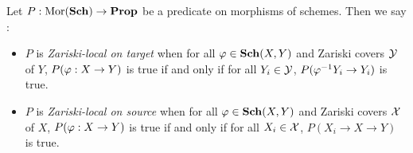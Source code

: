 \documentclass[../main.tex]{subfiles}
\begin{document}
\begin{dfn}
  Let $P : \operatorname{Mor}(\mathbf{Sch}) \to \mathbf{Prop}$ be a predicate on morphisms of schemes.
  Then we say :
  \begin{itemize}
    \item $P$ is \emph{Zariski-local on target} when 
    for all $\varphi \in \mathbf{Sch}(X,Y)$ and Zariski covers $\mathcal{Y}$ of $Y$,\newline
    $P(\varphi : X \to Y)$ is true if and only if 
    for all $Y_i \in \mathcal{Y}$, $P(\varphi^{-1} Y_i \to Y_i)$ is true. 
    \item $P$ is \emph{Zariski-local on source} when 
    for all $\varphi \in \mathbf{Sch}(X,Y)$ and Zariski covers $\mathcal{X}$ of $X$,\newline
    $P(\varphi : X \to Y)$ is true if and only if 
    for all $X_i \in \mathcal{X}$, $P(X_i \to X \to Y)$ is true.
  \end{itemize}
\end{dfn}
\end{document}
